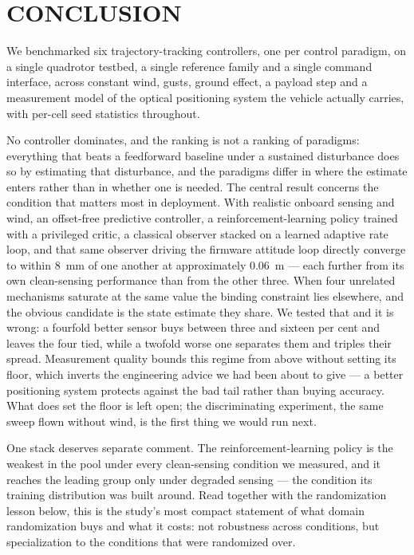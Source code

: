 \section{CONCLUSION}
\label{sec:conclusion}

We benchmarked six trajectory-tracking controllers, one per control paradigm, on a
single quadrotor testbed, a
single reference family and a single command interface, across constant wind, gusts,
ground effect, a payload step and a measurement model of the optical positioning system
the vehicle actually carries, with per-cell seed statistics throughout.

No controller dominates, and the ranking is not a ranking of paradigms: everything that
beats a feedforward baseline under a sustained disturbance does so by estimating that
disturbance, and the paradigms differ in where the estimate enters rather than in
whether one is needed. The central result concerns the condition that matters most in
deployment. With realistic onboard sensing and wind,
an offset-free predictive controller, a reinforcement-learning policy trained with a
privileged critic, a classical observer stacked on a learned adaptive rate loop, and that
same observer driving the firmware attitude loop directly converge to within
\SI{8}{\milli\meter} of one another at approximately \SI{0.06}{\meter} --- each further
from its own clean-sensing performance than from the other three. When four unrelated
mechanisms saturate at the same value the binding constraint lies elsewhere, and the
obvious candidate is the state estimate they share. We tested that and it is wrong: a
fourfold better sensor buys between three and sixteen per cent and leaves the four
tied, while a twofold worse one separates them and triples their spread. Measurement
quality bounds this regime from above without setting its floor, which inverts the
engineering advice we had been about to give --- a better positioning system protects
against the bad tail rather than buying accuracy. What does set the floor is left open;
the discriminating experiment, the same sweep flown without wind, is the first thing we
would run next.

One stack deserves separate comment. The reinforcement-learning policy is the weakest in
the pool under every clean-sensing condition we measured, and it reaches the leading
group only under degraded sensing --- the condition its training distribution was built
around. Read together with the randomization lesson below, this is the study's most
compact statement of what domain randomization buys and what it costs: not robustness
across conditions, but specialization to the conditions that were randomized over.

